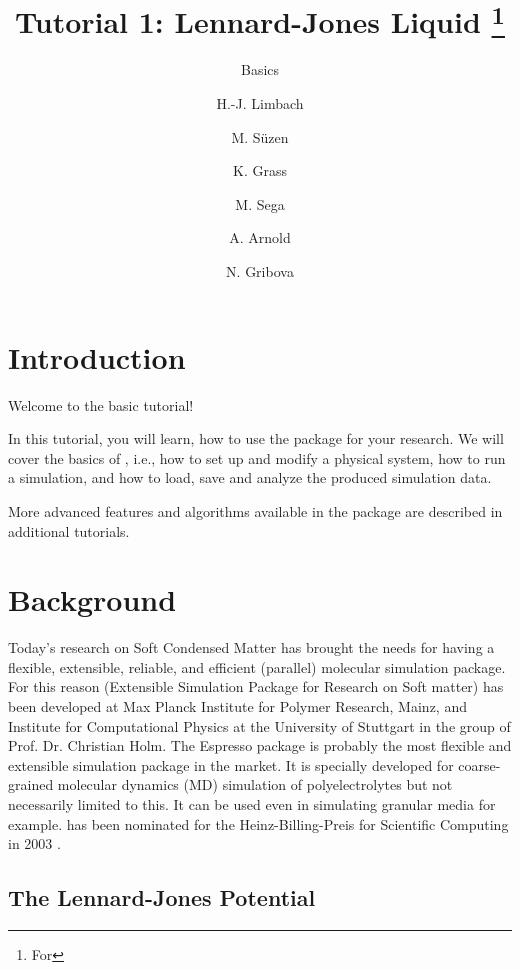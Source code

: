 \documentclass[
paper=a4,                       %
fontsize=11pt,                  %
twoside,                        %
footsepline,                    %
headsepline,                    %
headinclude=false,              %
footinclude=false,              %
pagesize,                       %
]{scrartcl}
\begin{document}
\esptitlehead

\title{Tutorial 1: Lennard-Jones Liquid%
\ifdefined\esversion%
\thanks{For \es \esversion}%
\fi%
}
\subtitle{\es Basics}
\author{H.-J. Limbach \and M. S\"uzen \and K. Grass \and M. Sega \and
  A. Arnold \and N. Gribova}
\maketitle
\tableofcontents

\section{Introduction}

Welcome to the basic \es{} tutorial!

In this tutorial, you will learn, how to use the \es{} package for your 
research. We will cover the basics of \es, i.e., how to set up and modify a 
physical system, how to run a simulation, and how to load, save and analyze
the produced simulation data.

More advanced features and algorithms available in the \es{} package are 
described in additional tutorials.


\section{Background}

Today's research on Soft Condensed Matter has brought the needs for having a 
flexible, extensible, reliable, and efficient (parallel) molecular simulation 
package. For this reason \es{} (Extensible Simulation Package for Research on 
Soft matter) \cite{esp_url} has been developed at Max Planck Institute for 
Polymer Research, Mainz, and Institute for Computational Physics at the University of Stuttgart in  the group of Prof. Dr. Christian Holm\cite{limbach2006ees,arnold13a}. The Espresso package is probably the most flexible and 
extensible simulation package in the market. It is specially developed for 
coarse-grained molecular dynamics (MD) simulation of polyelectrolytes but not 
necessarily limited to this. It can be used even in simulating granular media 
for example. \es{} has been nominated for the Heinz-Billing-Preis for 
Scientific Computing in 2003 \cite{arnold2003ees}.

\subsection{The Lennard-Jones Potential}
\end{document}

